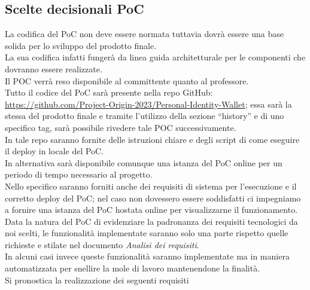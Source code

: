 \subsection{Scelte decisionali PoC}

La codifica del PoC non deve essere normata tuttavia dovrà essere una base solida per lo sviluppo del prodotto finale.\\
La sua codifica infatti fungerà da linea guida architetturale per le componenti che dovranno essere realizzate.\\
Il POC verrà reso disponibile al committente quanto al professore.\\
Tutto il codice del PoC sarà presente nella repo GitHub: \url{https://github.com/Project-Origin-2023/Personal-Identity-Wallet}; essa sarà la stessa del prodotto finale e tramite l’utilizzo della sezione “history” e di uno specifico tag, sarà possibile rivedere tale POC successivamente.\\
In tale repo saranno fornite delle istruzioni chiare e degli script di come eseguire il deploy in locale del PoC.\\
In alternativa sarà disponibile comunque una istanza del PoC online per un periodo di tempo necessario al progetto.\\
Nello specifico saranno forniti anche dei requisiti di sistema per l’esecuzione e il corretto deploy del PoC; nel caso non dovessero essere soddisfatti ci impegniamo a fornire una istanza del PoC hostata online per visualizzarne il funzionamento.\\
Data la natura del PoC di evidenziare la padronanza dei requisiti tecnologici da noi scelti, le funzionalità implementate saranno solo una parte rispetto quelle richieste e stilate nel documento \textit{Analisi dei requisiti}.\\
In alcuni casi invece queste funzionalità saranno implementate ma in maniera automatizzata per snellire la mole di lavoro mantenendone la finalità. \\
Si pronostica la realizzazione dei seguenti requisiti
